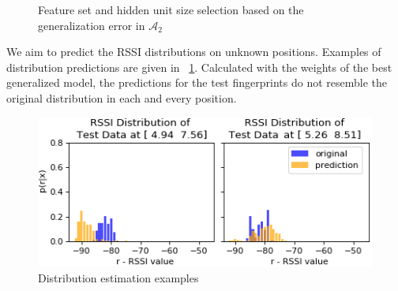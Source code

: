 \documentclass{article}
\begin{document}
	\begin{figure}[h]
		\centering
		\caption{Feature set and hidden unit size selection based on the generalization error in $\mathcal{A}_2$}
	\end{figure}
	
	We aim to predict the RSSI distributions on unknown positions. Examples of distribution predictions are given in \figurename~\ref{fig:predictions}. Calculated with the weights of the best generalized model, the predictions for the test fingerprints do not resemble the original distribution in each and every position. 
	\begin{figure}[h]
		\centering
		\includegraphics[width=0.8\linewidth]{Pred-Test-3-mini-3}
		
		\caption{Distribution estimation examples}
		\label{fig:predictions}
	\end{figure} 
	
\end{document}
